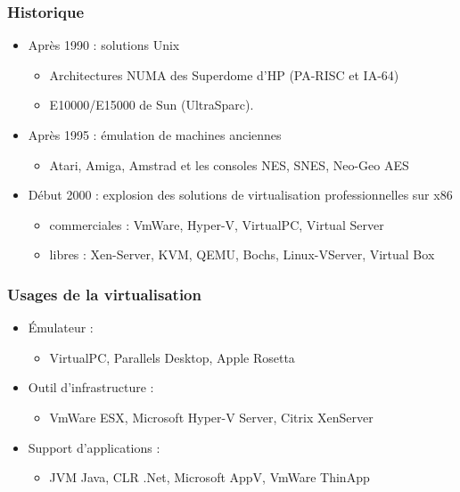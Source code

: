 \begin{frame}
\frametitle{Historique}
\begin{itemize}
\item <1>Après 1990 : solutions Unix
\begin{itemize}
\item Architectures NUMA des Superdome d'HP (PA-RISC et IA-64)
\item E10000/E15000 de Sun (UltraSparc).
\end{itemize}

\item <2>Après 1995 : émulation de machines anciennes
\begin{itemize}
\item Atari, Amiga, Amstrad et les consoles NES, SNES, Neo-Geo AES
\end{itemize}

\item <3>Début 2000 : explosion des solutions de virtualisation professionnelles sur x86
\begin{itemize}
\item commerciales : VmWare, Hyper-V, VirtualPC, Virtual Server 
\item libres : Xen-Server, KVM, QEMU, Bochs, Linux-VServer, Virtual Box
\end{itemize}
\end{itemize}

\end{frame}


\begin{frame}
\frametitle{Usages de la virtualisation}
\begin{itemize}

\item <1>Émulateur :
\begin{itemize}
\item VirtualPC, Parallels Desktop, Apple Rosetta
\end{itemize}

\item <2>Outil d'infrastructure :
\begin{itemize}
\item VmWare ESX, Microsoft Hyper-V Server, Citrix XenServer
\end{itemize}

\item <3>Support d'applications :
\begin{itemize}
\item JVM Java, CLR .Net, Microsoft AppV, VmWare ThinApp
\end{itemize}

\end{itemize}
\end{frame}


